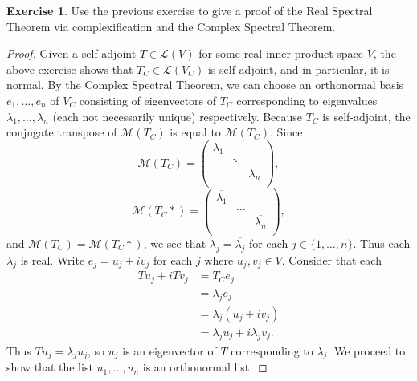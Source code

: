 \documentclass{article}
\theoremstyle{definition}
\newtheorem{ex}{Exercise}
\begin{document}
\begin{ex}
	Use the previous exercise to give a proof of the Real Spectral Theorem via complexification and the Complex Spectral Theorem.
\end{ex}
\begin{proof}
	Given a self-adjoint $T \in \mathcal{L}(V)$ for some real inner product space $V$, the above exercise shows that $T_C \in \mathcal{L}(V_C)$ is self-adjoint, and in particular, it is normal.
	By the Complex Spectral Theorem, we can choose an orthonormal basis $e_1, \dots, e_n$ of $V_C$ consisting of eigenvectors of $T_C$ corresponding to eigenvalues $\lambda_1, \dots, \lambda_n$ (each not necessarily unique) respectively.
	Because $T_C$ is self-adjoint, the conjugate transpose of $\mathcal{M}(T_C)$ is equal to $\mathcal{M}(T_C)$.
	Since \begin{equation*}
		\mathcal{M}(T_C) = \begin{pmatrix}
			\lambda_1 &        &           \\
			          & \ddots &           \\
			          &        & \lambda_n \\
		\end{pmatrix},
	\end{equation*}
	\begin{equation*}
		\mathcal{M}(T_C*) = \begin{pmatrix}
			\overline{\lambda_1} &       &                      \\
			                     & \dots &                      \\
			                     &       & \overline{\lambda_n} \\
		\end{pmatrix},
	\end{equation*}
	and $\mathcal{M}(T_C) = \mathcal{M}(T_C*)$, we see that $\lambda_j = \overline{\lambda_j}$ for each $j \in \lbrace 1, \dots, n  \rbrace$.
	Thus each $\lambda_j$ is real.
	Write $e_j = u_j + iv_j$ for each $j$ where $u_j, v_j \in V$.
	Consider that each \begin{align*}
		Tu_j + iTv_j & = T_C e_j                          \\
		             & = \lambda_j e_j                    \\
		             & = \lambda_j (u_j + iv_j)           \\
		             & = \lambda_j u_j + i \lambda_j v_j.
	\end{align*}
	Thus $Tu_j = \lambda_j u_j$, so $u_j$ is an eigenvector of $T$ corresponding to $\lambda_j$.
	We proceed to show that the list $u_1, \dots, u_n$ is an orthonormal list.


\end{proof}
\end{document}
